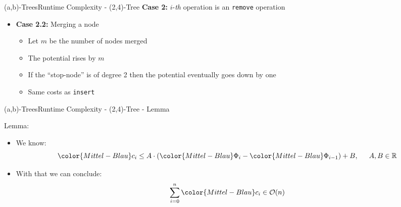 \begin{frame}{(a,b)-Trees}{Runtime Complexity - (2,4)-Tree}
  \textbf{Case 2:}
  {\color{Mittel-Blau}$i$}-\textit{th} operation is an
  \texttt{\color{Mittel-Blau}remove} operation
  \begin{itemize}
    \item
    \textbf{Case 2.2:} Merging a node
    \begin{itemize}
      \item
        Let {\color{Mittel-Blau}$m$} be the number of nodes merged
      \item
        The potential rises by {\color{Mittel-Blau}$m$}
      \item
        If the \enquote{stop-node} is of {\color{Mittel-Blau}degree 2} then the
        potential eventually goes down by one
      \item
        Same costs as \texttt{\color{Mittel-Blau}insert}
    \end{itemize}
  \end{itemize}
\end{frame}


\begin{frame}{(a,b)-Trees}{Runtime Complexity - (2,4)-Tree - Lemma}
  \begin{block}{Lemma:}
    \begin{itemize}
      \item
        We know:
        \begin{displaymath}
        {\color{Mittel-Blau}c_i} \leq A \cdot \left(
        {\color{Mittel-Blau}\Phi_i} - {\color{Mittel-Blau}\Phi_{i-1}}
        \right) + B, \hspace{1.5em}A,B \in \mathbb{R}
        \end{displaymath}
      \item
        With that we can conclude:
        \begin{displaymath}
          \sum_{i=0}^{n} {\color{Mittel-Blau}c_i} \in \mathcal{O}(n)
        \end{displaymath}
    \end{itemize}
  \end{block}
\end{frame}


